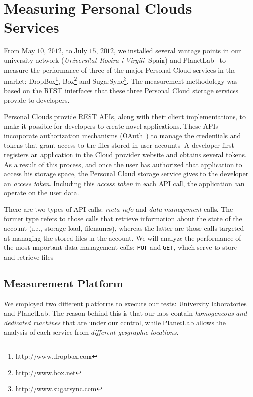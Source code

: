 \chapter{Measuring Personal Clouds Services}

From May $10$, $2012$, to July $15$, $2012$, we installed several
vantage points in our university network (\textit{Universitat
Rovira i Virgili}, Spain) and PlanetLab~\cite{planetlab}  
to measure the performance of three of the major Personal Cloud services in the market: DropBox\footnote{\url{http://www.dropbox.com}}, Box\footnote{\url{http://www.box.net}} 
and SugarSync\footnote{\url{http://www.sugarsync.com}}. The measurement methodology was based on the REST interfaces that these three Personal Cloud storage services provide to developers.

Personal Clouds provide REST APIs, along with
their client implementations, to make it possible for developers to
create novel applications. These APIs incorporate authorization
mechanisms (OAuth~\cite{oauth}) to manage the credentials and tokens
that grant access to the files stored in user accounts. A
developer first registers an application 
in the Cloud provider website and obtains several tokens.
As a result of this process, and once the user has authorized
that application to access his storage space, the Personal Cloud storage service
gives to the developer an \textit{access token}. Including this \textit{access token} in each API call, the application can operate on the user data.

There are two types of API calls: \textit{meta-info} and
\textit{data management} calls. The former type refers to
those calls that retrieve information about the state of the
account (i.e., storage load, filenames), whereas the latter
are those calls targeted at managing the stored files
in the account. %
We will analyze the performance
of the most important data management calls: \texttt{PUT} and \texttt{GET},
which serve to store and retrieve files.  


\section{Measurement Platform} 

We employed two different platforms
to execute our tests: University laboratories and PlanetLab.
The reason behind this is that our labs contain
\textit{homogeneous and dedicated machines} that are under our control,
while PlanetLab allows the analysis of each service from \textit{different geographic locations}. 

